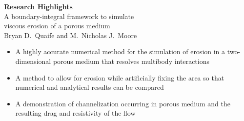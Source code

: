 \documentclass[11pt]{article}
\begin{document}
\begin{center}
  {\bf Research Highlights} \\
  A boundary-integral framework to simulate \\ viscous erosion of a
  porous medium \\
  Bryan D.~Quaife and M.~Nicholas J.~Moore
\end{center}

\begin{itemize}
  \item A highly accurate numerical method for the simulation of erosion
    in a two-dimensional porous medium that resolves multibody
    interactions
  \item A method to allow for erosion while artificially fixing the area
    so that numerical and analytical results can be compared
  \item A demonstration of channelization occurring in porous medium and
    the resulting drag and resistivity of the flow

\end{itemize}
\end{document}

